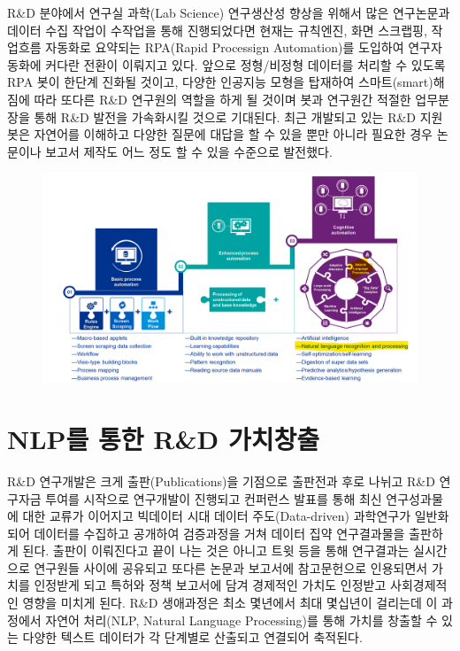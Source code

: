 \documentclass[smallextended]{svjour3}       %
\begin{document}
R\&D 분야에서 연구실 과학(Lab Science) 연구생산성 향상을 위해서 많은
연구논문과 데이터 수집 작업이 수작업을 통해 진행되었다면 현재는
규칙엔진, 화면 스크랩핑, 작업흐름 자동화로 요약되는 RPA(Rapid Processign
Automation)를 도입하여 연구자동화에 커다란 전환이 이뤄지고 있다. 앞으로
정형/비정형 데이터를 처리할 수 있도록 RPA 봇이 한단계 진화될 것이고,
다양한 인공지능 모형을 탑재하여 스마트(smart)해짐에 따라 또다른 R\&D
연구원의 역할을 하게 될 것이며 봇과 연구원간 적절한 업무분장을 통해 R\&D
발전을 가속화시킬 것으로 기대된다. 최근 개발되고 있는 R\&D 지원 봇은
자연어를 이해하고 다양한 질문에 대답을 할 수 있을 뿐만 아니라 필요한
경우 논문이나 보고서 제작도 어느 정도 할 수 있을 수준으로 발전했다.

\begin{figure}

{\centering \includegraphics[width=1\linewidth]{fig/koita-evolution} 

}

\end{figure}

\hypertarget{dimensions-ai}{%
\section{NLP를 통한 R\&D 가치창출}\label{dimensions-ai}}

R\&D 연구개발\cite{herzog2020dimensions}은 크게 출판(Publications)을
기점으로 출판전과 후로 나뉘고 R\&D 연구자금 투여를 시작으로 연구개발이
진행되고 컨퍼런스 발표를 통해 최신 연구성과물에 대한 교류가 이어지고
빅데이터 시대 데이터 주도(Data-driven) 과학연구가 일반화되어 데이터를
수집하고 공개하여 검증과정을 거쳐 데이터 집약 연구결과물을 출판하게
된다. 출판이 이뤄진다고 끝이 나는 것은 아니고 트윗 등을 통해 연구결과는
실시간으로 연구원들 사이에 공유되고 또다른 논문과 보고서에 참고문헌으로
인용되면서 가치를 인정받게 되고 특허와 정책 보고서에 담겨 경제적인
가치도 인정받고 사회경제적인 영향을 미치게 된다. R\&D 생애과정은 최소
몇년에서 최대 몇십년이 걸리는데 이 과정에서 자연어 처리(NLP, Natural
Language Processing)를 통해 가치를 창출할 수 있는 다양한 텍스트 데이터가
각 단계별로 산출되고 연결되어 축적된다.
\end{document}

